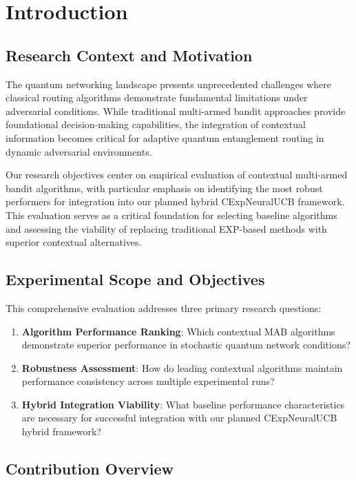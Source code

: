 \documentclass[12pt,a4paper]{article}
\begin{document}
\newpage
\section{Introduction}

\subsection{Research Context and Motivation}

The quantum networking landscape presents unprecedented challenges where classical routing algorithms demonstrate fundamental limitations under adversarial conditions. While traditional multi-armed bandit approaches provide foundational decision-making capabilities, the integration of contextual information becomes critical for adaptive quantum entanglement routing in dynamic adversarial environments.

Our research objectives center on empirical evaluation of contextual multi-armed bandit algorithms, with particular emphasis on identifying the most robust performers for integration into our planned hybrid CExpNeuralUCB framework. This evaluation serves as a critical foundation for selecting baseline algorithms and assessing the viability of replacing traditional EXP-based methods with superior contextual alternatives.

\subsection{Experimental Scope and Objectives}

This comprehensive evaluation addresses three primary research questions:

\begin{enumerate}
\item \textbf{Algorithm Performance Ranking}: Which contextual MAB algorithms demonstrate superior performance in stochastic quantum network conditions?
\item \textbf{Robustness Assessment}: How do leading contextual algorithms maintain performance consistency across multiple experimental runs?
\item \textbf{Hybrid Integration Viability}: What baseline performance characteristics are necessary for successful integration with our planned CExpNeuralUCB hybrid framework?
\end{enumerate}

\subsection{Contribution Overview}
\end{document}
